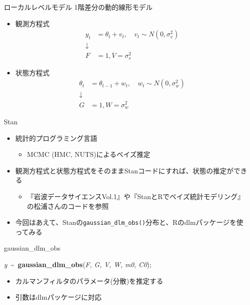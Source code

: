 \documentclass[dvipdfmx,12pt]{beamer}
\begin{document}
\begin{frame}{ローカルレベルモデル}
  1階差分の動的線形モデル

  \begin{itemize}
  \item 観測方程式
    \begin{align*}
      y_{t} &= \theta_{t} + v_{t}, \quad v_{t} \sim N(0, \sigma_{v}^2) \\
      \downarrow \\
      F &= 1, V = \sigma_{v}^2
    \end{align*}

  \item 状態方程式
    \begin{align*}
      \theta_{t} &= \theta_{t-1} + w_{t}, \quad w_{t} \sim N(0, \sigma_{w}^2) \\
      \downarrow \\
      G &= 1, W = \sigma_{w}^2
    \end{align*}
  \end{itemize}
\end{frame}

\begin{frame}{Stan}
  \begin{itemize}
  \item 統計的プログラミング言語
    \begin{itemize}
    \item MCMC (HMC, NUTS)によるベイズ推定
    \end{itemize}
  \item 観測方程式と状態方程式をそのまま\textsf{Stan}コードにすれば、状態の推定ができる
    \begin{itemize}
    \item 『岩波データサイエンスVol.1』や『StanとRでベイズ統計モデリング』の松浦さんのコードを参照
    \end{itemize}
  \item 今回はあえて、\textsf{Stan}の\texttt{gaussian\_dlm\_obs()}分布と、\textsf{R}の\textsf{dlm}パッケージを使ってみる
  \end{itemize}
\end{frame}

\begin{frame}{gaussian\_dlm\_obs}

  \textit{y}~\textasciitilde~\textbf{gaussian\_dlm\_obs}(\textit{F, G, V, W, m0, C0});

  \begin{itemize}
  \item カルマンフィルタのパラメータ(分散)を推定する
  \item 引数は\textsf{dlm}パッケージに対応
  \end{itemize}
\end{frame}
\end{document}
